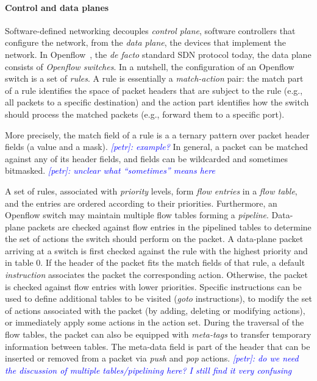\documentclass[conference]{sigcomm-alternate}
\newcommand{\petr}[1]{\textit{\textcolor{blue}{[petr]: #1}}} %
\begin{document}

\paragraph{Control and data planes}
Software-defined networking decouples \emph{control plane}, software
controllers that configure the network, from the \emph{data plane}, the
devices that implement the network.  
% 
In Openflow~\cite{of-spec}, the \emph{de facto} standard SDN protocol
today, the data plane consists of \emph{Openflow switches}. 
In a nutshell, the configuration of an Openflow switch is a set of
\emph{rules}. 
A rule is essentially a \emph{match-action} pair:
the match part of a rule identifies the space of packet headers that are
subject to the rule (e.g., all packets to a specific destination) and
the action part identifies how the switch should process the matched
packets (e.g., forward them to a specific port).

More precisely, the match field of a rule is 
a  a ternary pattern over packet header fields
(a value and a mask).
\petr{example?}
In general, a packet can be matched against any of its header
fields, and fields can be wildcarded and sometimes bitmasked.
\petr{unclear what ``sometimes'' means here}



A set of rules, associated with \emph{priority} levels, form \emph{flow
  entries} in a \emph{flow table}, and the 
entries are ordered according to their priorities.
Furthermore, an Openflow switch may maintain multiple flow tables
forming a \emph{pipeline}.
Data-plane packets are checked against flow entries in the pipelined
tables to determine the set of actions the switch should perform on the packet.      
A data-plane packet arriving at a switch is first checked against
the rule with the highest priority and in table $0$. 
If the header of the packet fits the match fields of that rule, 
a default \emph{instruction} associates the packet the corresponding action.
Otherwise, the packet is checked against flow  entries with lower
priorities.  
Specific instructions can be used to define
additional tables to be visited (\textit{goto} instructions), to
modify the set of actions associated with the packet (by adding,
deleting or modifying actions), or immediately apply some actions in the action set. 
During the traversal of the flow tables, the packet can also be equipped with \emph{meta-tags} to
transfer temporary information between tables.
The meta-data field is part of the header that can be
inserted or removed from a packet via \emph{push} and \emph{pop}
actions. 
\petr{do we need the discussion of multiple tables/pipelining here? I still find it
  very confusing}
\end{document}
